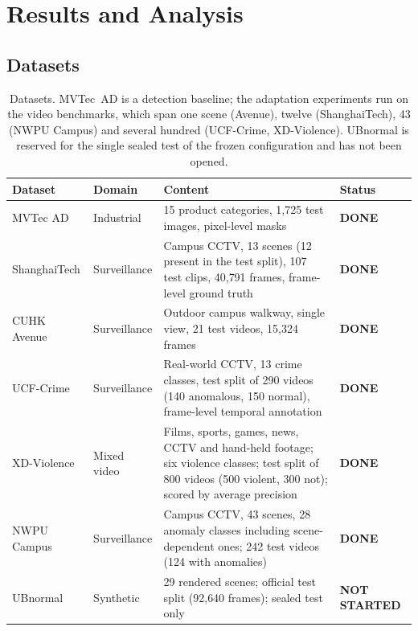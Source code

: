 \documentclass[a4paper,fleqn]{cas-sc}
\newcommand{\done}{{\sffamily\bfseries\color{donecol}DONE}}
\newcommand{\notstarted}{{\sffamily\bfseries\color{notecol}NOT STARTED}}
\begin{document}
\section{Results and Analysis}
\label{sec:results}

\subsection{Datasets}
\begin{table}[width=\linewidth,cols=4,pos=h]
\caption{Datasets. MVTec~AD is a detection baseline; the adaptation experiments
run on the video benchmarks, which span one scene (Avenue), twelve
(ShanghaiTech), 43 (NWPU Campus) and several hundred (UCF-Crime, XD-Violence).
UBnormal is reserved for the single sealed test of the frozen configuration and
has not been opened.}\label{tbl:datasets}
\begin{tabularx}{\linewidth}{@{}l l Z l@{}}
\toprule
\textbf{Dataset} & \textbf{Domain} & \textbf{Content} & \textbf{Status} \\
\midrule
MVTec AD \citep{bergmann2019mvtec} & Industrial & 15 product categories, 1{,}725 test images, pixel-level masks & \done \\
ShanghaiTech \citep{liu2018shanghaitech} & Surveillance & Campus CCTV, 13 scenes (12 present in the test split), 107 test clips, 40{,}791 frames, frame-level ground truth & \done \\
CUHK Avenue \citep{lu2013avenue} & Surveillance & Outdoor campus walkway, single view, 21 test videos, 15{,}324 frames & \done \\
UCF-Crime \citep{sultani2018ucfcrime} & Surveillance & Real-world CCTV, 13 crime classes, test split of 290 videos (140 anomalous, 150 normal), frame-level temporal annotation & \done \\
XD-Violence \citep{wu2020xdviolence} & Mixed video & Films, sports, games, news, CCTV and hand-held footage; six violence classes; test split of 800 videos (500 violent, 300 not); scored by average precision & \done \\
NWPU Campus \citep{cao2023nwpu} & Surveillance & Campus CCTV, 43 scenes, 28 anomaly classes including scene-dependent ones; 242 test videos (124 with anomalies) & \done \\
UBnormal \citep{acsintoae2022ubnormal} & Synthetic & 29 rendered scenes; official test split (92{,}640 frames); sealed test only & \notstarted \\
\bottomrule
\end{tabularx}
\end{table}
\end{document}
